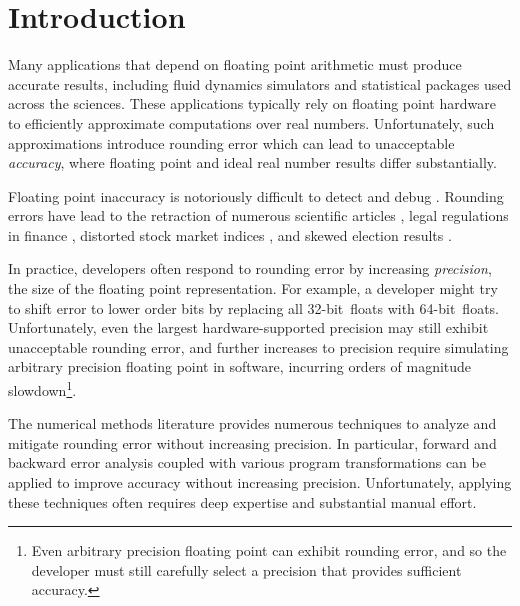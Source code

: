 \documentclass[paper.tex]{subfiles}
\begin{document}
\section{Introduction}
\label{sec:introduction}

Many applications that depend on floating point arithmetic must
produce accurate results, including fluid dynamics simulators and
statistical packages used across the sciences.  These applications
typically rely on floating point hardware to efficiently approximate
computations over real numbers.  Unfortunately, such approximations
introduce rounding error which can lead to unacceptable
\textit{accuracy}, where floating point and ideal real number results
differ substantially.


Floating point inaccuracy is notoriously difficult to detect and debug
.  Rounding errors have lead to the retraction of
numerous scientific articles , legal regulations in finance
, distorted stock market indices , and skewed
election results .

In practice, developers often respond to rounding error by increasing
\textit{precision}, the size of the floating point representation.
For example, a developer might try to shift error to lower order bits
by replacing all 32-bit~floats with 64-bit~floats.  Unfortunately,
even the largest hardware-supported precision may still exhibit
unacceptable rounding error, and further increases to precision
require simulating arbitrary precision floating point in software,
incurring orders of magnitude slowdown\footnote{Even arbitrary
  precision floating point can exhibit rounding error, and so the
  developer must still carefully select a precision that provides
  sufficient accuracy.}.

 The numerical methods literature provides numerous
techniques to analyze and mitigate rounding error without increasing
precision.  In
particular, forward and backward error analysis  coupled
with various program transformations  can be applied to
improve accuracy without increasing precision.  Unfortunately,
applying these techniques often requires deep expertise and
substantial manual effort.
\end{document}
